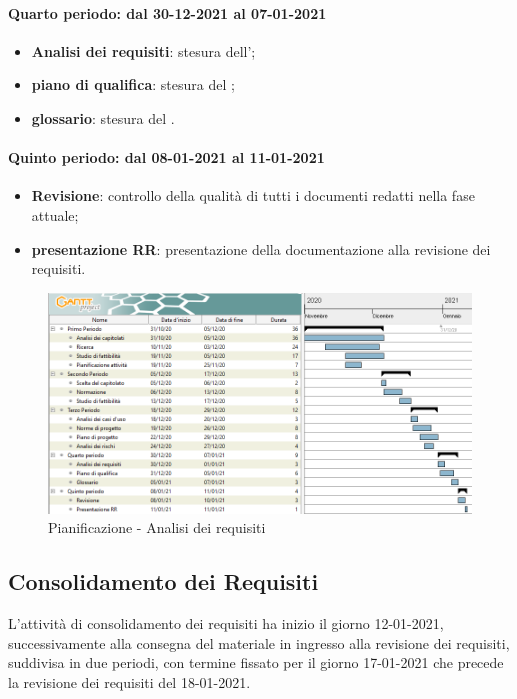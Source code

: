 \paragraph{Quarto periodo: dal 30-12-2021 al 07-01-2021} 
\begin{itemize} 
	\item \textbf{Analisi dei requisiti}: stesura dell’; 
	\item \textbf{piano di qualifica}: stesura del ; 
	\item \textbf{glossario}: stesura del . 
\end{itemize} 

\paragraph{Quinto periodo: dal 08-01-2021 al 11-01-2021} 
\begin{itemize} 
	\item \textbf{Revisione}: controllo della qualità di tutti i documenti redatti nella fase attuale; 
	\item \textbf{presentazione RR}: presentazione della documentazione alla revisione dei requisiti. 
\end{itemize} 


\newpage 

\begin{landscape} 
	\begin{figure}[h!] 
		\includegraphics[width=24cm]{images/1_Analisi_dei_requisiti.png} 
		\caption{Pianificazione - Analisi dei requisiti} 
	\end{figure} 
\end{landscape} 

\newpage %

\subsection{Consolidamento dei Requisiti} 
L'attività di consolidamento dei requisiti ha inizio il giorno 12-01-2021, successivamente alla consegna del materiale in ingresso alla revisione dei requisiti, suddivisa in due periodi, con termine fissato 
per il giorno 17-01-2021 che precede la revisione dei requisiti del 18-01-2021. 

